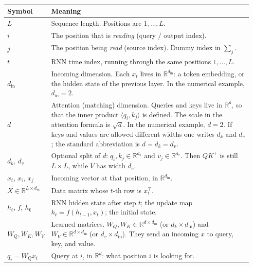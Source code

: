 \documentclass[11pt,a4paper]{article}
\theoremstyle{definition}
\begin{document}
{\small
\setlength{\tabcolsep}{3.2pt}
\renewcommand{\arraystretch}{1.18}
\begin{center}
\begin{tabularx}{\linewidth}{|
  >{\raggedright\arraybackslash}p{3.05cm}|
  >{\raggedright\arraybackslash}X|
}
\hline
\textbf{Symbol} & \textbf{Meaning} \\
\hline
\(L\) & Sequence length. Positions are \(1,\ldots,L\). \\
\hline
\(i\) & The position that is \emph{reading} (query / output index). \\
\hline
\(j\) & The position being \emph{read} (source index). Dummy index in \(\sum_j\). \\
\hline
\(t\) & RNN time index, running through the same positions \(1,\ldots,L\). \\
\hline
\(d_{\mathrm{in}}\) & Incoming dimension. Each \(x_t\) lives in \(\mathbb{R}^{d_{\mathrm{in}}}\): a token embedding, or the hidden state of the previous layer. In the numerical example, \(d_{\mathrm{in}}=2\). \\
\hline
\(d\) & Attention (matching) dimension. Queries and keys live in \(\mathbb{R}^d\), so that the inner product \(\langle q_i,k_j\rangle\) is defined. The scale in the attention formula is \(\sqrt{d}\). In the numerical example, \(d=2\). If keys and values are allowed different widths one writes \(d_k\) and \(d_v\); the standard abbreviation is \(d=d_k=d_v\). \\
\hline
\(d_k\), \(d_v\) & Optional split of \(d\): \(q_i,k_j\in\mathbb{R}^{d_k}\) and \(v_j\in\mathbb{R}^{d_v}\). Then \(QK^\top\) is still \(L\times L\), while \(V\) has width \(d_v\). \\
\hline
\(x_t\), \(x_i\), \(x_j\) & Incoming vector at that position, in \(\mathbb{R}^{d_{\mathrm{in}}}\). \\
\hline
\(X\in\mathbb{R}^{L\times d_{\mathrm{in}}}\) & Data matrix whose \(t\)-th row is \(x_t^\top\). \\
\hline
\(h_t\), \(f\), \(h_0\) & RNN hidden state after step \(t\); the update map \(h_t=f(h_{t-1},x_t)\); the initial state. \\
\hline
\(W_Q,W_K,W_V\) & Learned matrices. \(W_Q,W_K\in\mathbb{R}^{d\times d_{\mathrm{in}}}\) (or \(d_k\times d_{\mathrm{in}}\)) and \(W_V\in\mathbb{R}^{d\times d_{\mathrm{in}}}\) (or \(d_v\times d_{\mathrm{in}}\)). They send an incoming \(x\) to query, key, and value. \\
\hline
\(q_i=W_Q x_i\) & Query at \(i\), in \(\mathbb{R}^d\): what position \(i\) is looking for. \\

\end{tabularx}
\end{center}}
\end{document}
